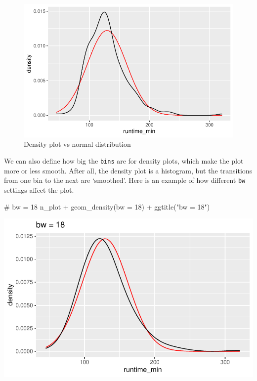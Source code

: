 \documentclass[
  letterpaper,
]{krantz}
\makeatletter
\newenvironment{Shaded}{\begin{snugshade}}{\end{snugshade}}
\newcommand{\AttributeTok}[1]{\textcolor[rgb]{0.40,0.45,0.13}{#1}}
\newcommand{\CommentTok}[1]{\textcolor[rgb]{0.37,0.37,0.37}{#1}}
\newcommand{\DecValTok}[1]{\textcolor[rgb]{0.68,0.00,0.00}{#1}}
\newcommand{\FunctionTok}[1]{\textcolor[rgb]{0.28,0.35,0.67}{#1}}
\newcommand{\NormalTok}[1]{\textcolor[rgb]{0.00,0.23,0.31}{#1}}
\newcommand{\SpecialCharTok}[1]{\textcolor[rgb]{0.37,0.37,0.37}{#1}}
\newcommand{\StringTok}[1]{\textcolor[rgb]{0.13,0.47,0.30}{#1}}
\newenvironment{kframe}{%
\medskip{}
\setlength{\fboxsep}{.8em}
 \def\at@end@of@kframe{}%
 \ifinner\ifhmode%
  \def\at@end@of@kframe{\end{minipage}}%
  \begin{minipage}{\columnwidth}%
 \fi\fi%
 \def\FrameCommand##1{\hskip\@totalleftmargin \hskip-\fboxsep
 \colorbox{shadecolor}{##1}\hskip-\fboxsep
     \hskip-\linewidth \hskip-\@totalleftmargin \hskip\columnwidth}%
 \MakeFramed {\advance\hsize-\width
   \@totalleftmargin\z@ \linewidth\hsize
   \@setminipage}}%
 {\par\unskip\endMakeFramed%
 \at@end@of@kframe}
\renewenvironment{Shaded}{\begin{kframe}}{\end{kframe}}
\makeatother
\begin{document}
\begin{figure}[H]

{\centering \includegraphics{08_descriptive_statistics_files/figure-pdf/density-vs-normal-1.pdf}

}

\caption{Density plot vs normal distribution}

\end{figure}%

We can also define how big the \texttt{bins} are for density plots,
which make the plot more or less smooth. After all, the density plot is
a histogram, but the transitions from one bin to the next are
`smoothed'. Here is an example of how different \texttt{bw} settings
affect the plot.

\begin{Shaded}
\begin{Highlighting}[]
\CommentTok{\# bw = 18}
\NormalTok{n\_plot }\SpecialCharTok{+}
  \FunctionTok{geom\_density}\NormalTok{(}\AttributeTok{bw =} \DecValTok{18}\NormalTok{) }\SpecialCharTok{+}
  \FunctionTok{ggtitle}\NormalTok{(}\StringTok{"bw = 18"}\NormalTok{)}
\end{Highlighting}
\end{Shaded}

\includegraphics{08_descriptive_statistics_files/figure-pdf/density-vs-normal-bw-settings-eighteen-1.pdf}
\end{document}
